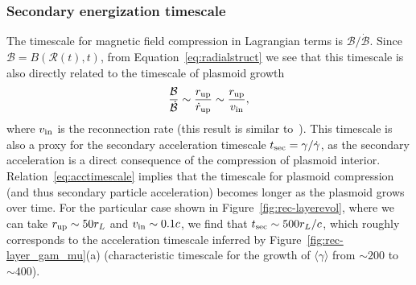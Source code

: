 \subsubsection{Secondary energization timescale}



The timescale for magnetic field compression in Lagrangian terms is $\mathcal{B} / \dot{\mathcal{B}}$. Since $\mathcal{B} = B(\mathcal{R}(t), t)$, from Equation~\eqref{eq:radialstruct} we see that this timescale is also directly related to the timescale of plasmoid growth
\begin{equation}
    \label{eq:acctimescale}
    \frac{\mathcal{B}}{\dot{\mathcal{B}}} \sim \frac{r_{\rm up}}{\dot{r}_{\rm up}} \sim \frac{r_{\rm up}}{v_{\rm in}},
\end{equation}
where $v_{\rm in}$ is the reconnection rate (this result is similar to~\citealt{2016MNRAS.462...48S}). This timescale is also a proxy for the secondary acceleration timescale $t_{\rm sec} = \gamma / \dot{\gamma}$, as the secondary acceleration is a direct consequence of the compression of plasmoid interior. Relation~\eqref{eq:acctimescale} implies that the timescale for plasmoid compression (and thus secondary particle acceleration) becomes longer as the plasmoid grows over time. For the particular case shown in Figure~\ref{fig:rec-layerevol}, where we can take $r_{\rm up}\sim 50r_L$ and $v_{\rm in}\sim 0.1 c$, we find that $t_{\rm sec}\sim 500r_L / c$, which roughly corresponds to the acceleration timescale inferred by Figure~\ref{fig:rec-layer_gam_mu}(a) (characteristic timescale for the growth of $\langle\gamma\rangle$ from $\sim 200$ to $\sim 400$).

